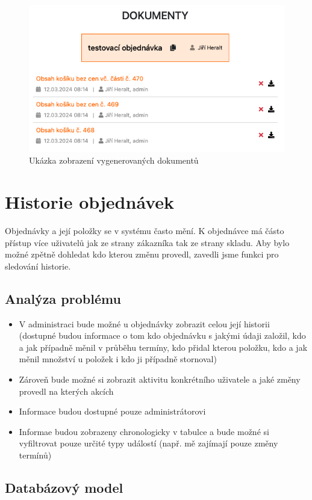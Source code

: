 \begin{figure}
    \centering
    \includegraphics[width=0.5\linewidth]{Figures/karta-dokumenty.png}
    \caption{Ukázka zobrazení vygenerovaných dokumentů}
    \label{fig:enter-label}
\end{figure}

\section{Historie objednávek}

Objednávky a její položky se v systému často mění. K objednávce má částo přístup více uživatelů jak ze strany zákazníka tak ze strany skladu. Aby bylo možné zpětně dohledat kdo kterou změnu provedl, zavedli jsme funkci pro sledování historie. 

\subsection{Analýza problému}

\begin{itemize}
    \item V administraci bude možné u objednávky zobrazit celou její historii (dostupné budou informace o tom kdo objednávku s jakými údaji založil, kdo a jak případně měnil v průběhu termíny, kdo přidal kterou položku, kdo a jak měnil množství u položek i kdo ji případně stornoval) 
    \item Zároveň bude možné si zobrazit aktivitu konkrétního uživatele a jaké změny provedl na kterých akcích
    \item Informace budou dostupné pouze administrátorovi 
    \item Informae budou zobrazeny chronologicky v tabulce a bude možné si vyfiltrovat pouze určité typy událostí (např. mě zajímají pouze změny termínů) 
\end{itemize}

\subsection{Databázový model}

